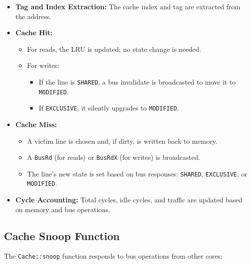 \documentclass[a4paper,12pt]{article}
\begin{document}
\begin{itemize}
    \item \textbf{Tag and Index Extraction:} The cache index and tag are extracted from the address.
    \item \textbf{Cache Hit:}
    \begin{itemize}
        \item For reads, the LRU is updated; no state change is needed.
        \item For writes:
        \begin{itemize}
            \item If the line is \texttt{SHARED}, a bus invalidate is broadcasted to move it to \texttt{MODIFIED}.
            \item If \texttt{EXCLUSIVE}, it silently upgrades to \texttt{MODIFIED}.
        \end{itemize}
    \end{itemize}
    \item \textbf{Cache Miss:}
    \begin{itemize}
        \item A victim line is chosen and, if dirty, is written back to memory.
        \item A \texttt{BusRd} (for reads) or \texttt{BusRdX} (for writes) is broadcasted.
        \item The line's new state is set based on bus responses: \texttt{SHARED}, \texttt{EXCLUSIVE}, or \texttt{MODIFIED}.
    \end{itemize}
    \item \textbf{Cycle Accounting:} Total cycles, idle cycles, and traffic are updated based on memory and bus operations.
\end{itemize}

\subsection{Cache Snoop Function}

The \texttt{Cache::snoop} function responds to bus operations from other cores:
\end{document}

